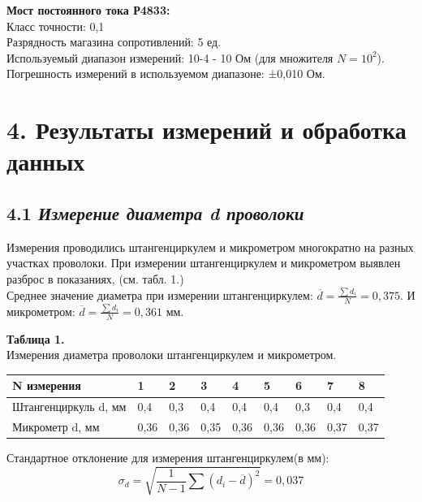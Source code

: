 \textbf{Мост постоянного тока Р4833:}\\
Класс точности: 0,1\\
Разрядность магазина сопротивлений: 5 ед.\\
Используемый диапазон измерений: 10-4 - 10 Ом (для множителя $N = 10^2$).\\
Погрешность измерений в используемом диапазоне: ±0,010 Ом.\\

\section*{4. Результаты измерений и обработка данных}
\subsection*{4.1 \textit{Измерение диаметра d проволоки}}


Измерения проводились штангенциркулем и микрометром многократно на разных участках
проволоки. При измерении штангенциркулем и микрометром выявлен разброс в показаниях, (см. табл. 1.)\\




Среднее значение диаметра при измерении штангенциркулем: $\overline{d} = \frac{\sum d_{i}}{N} = 0,375$. И микрометром: $\overline{d} = \frac{\sum d_{i}}{N} = 0,361$ мм. 


\begin{flushright}
{\scriptsize \textbf{Таблица 1.}\\Измерения диаметра проволоки штангенциркулем и микрометром.}
\end{flushright} 


\begin{table}[h!]
\begin{tabular}{|l|l|l|l|l|l|l|l|l|}
\hline
N измерения          & 1    & 2    & 3    & 4    & 5    & 6    & 7    & 8    \\ \hline
Штангенциркуль d, мм & 0,4  & 0,3  & 0,4  & 0,4  & 0,4  & 0,3  & 0,4  & 0,4  \\ \hline
Микрометр d, мм      & 0,36 & 0,36 & 0,35 & 0,36 & 0,36 & 0,36 & 0,37 & 0,37 \\ \hline
\end{tabular}
\end{table}


Стандартное отклонение для измерения штангенциркулем(в мм):
\begin{equation}
    \sigma_{d} = \sqrt{\frac{1}{N-1}\sum (d_{i}-\overline{d})^2} = 0,037
\end{equation}


